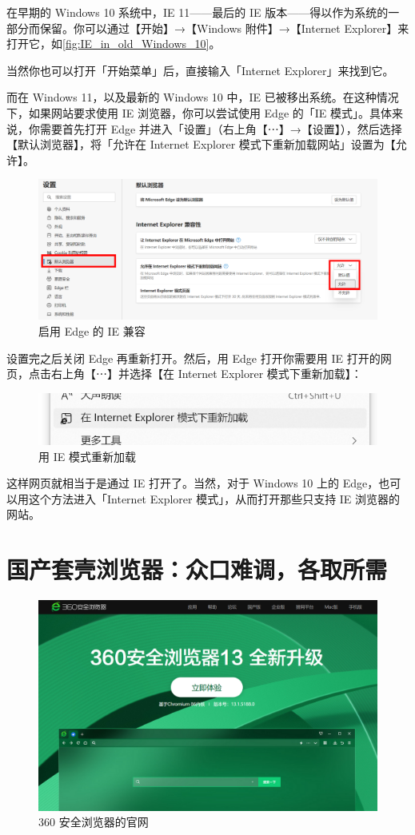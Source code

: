 在早期的 Windows 10 系统中，IE 11——最后的 IE 版本——得以作为系统的一部分而保留。你可以通过【开始】→【Windows 附件】→【Internet Explorer】来打开它，如\autoref{fig:IE_in_old_Windows_10}。

当然你也可以打开「开始菜单」后，直接输入「Internet Explorer」来找到它。

而在 Windows 11，以及最新的 Windows 10 中，IE 已被移出系统。在这种情况下，如果网站要求使用 IE 浏览器，你可以尝试使用 Edge 的「IE 模式」。具体来说，你需要首先打开 Edge 并进入「设置」（右上角【⋯】→【设置】），然后选择【默认浏览器】，将「允许在 Internet Explorer 模式下重新加载网站」设置为【允许】。

\begin{figure}[htb!]
  \centering
  \includegraphics[width=.7\textwidth]{assets/software/Edge_IE_Mode_1.png}
  \caption{启用 Edge 的 IE 兼容}
  \label{fig:Edge_IE_Mode_1}
\end{figure}

设置完之后关闭 Edge 再重新打开。然后，用 Edge 打开你需要用 IE 打开的网页，点击右上角【⋯】并选择【在 Internet Explorer 模式下重新加载】：

\begin{figure}[htb!]
  \centering
  \includegraphics[width=.4\textwidth]{assets/software/Reload_in_IE_mode.png}
  \caption{用 IE 模式重新加载}
  \label{fig:Reload_in_IE_Mode}
\end{figure}

这样网页就相当于是通过 IE 打开了。当然，对于 Windows 10 上的 Edge，也可以用这个方法进入「Internet Explorer 模式」，从而打开那些只支持 IE 浏览器的网站。

\section{国产套壳浏览器：众口难调，各取所需}

\begin{figure}[htb!]
  \centering
  \includegraphics[width=.7\textwidth]{assets/software/360_se_homepage.png}
  \caption{360 安全浏览器的官网}
  \label{fig:360_se_homepage}
\end{figure}


